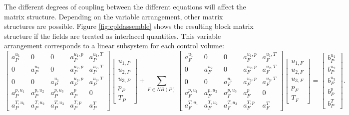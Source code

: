 The different degrees of coupling between the different equations will affect the matrix structure. Depending on the variable arrangement, other matrix structures are possible. Figure \ref{fig:cpldassemble} shows the resulting block matrix structure if the fields are treated as interlaced quantities. This variable arrangement corresponds to a linear subsystem for each control volume:
\begin{displaymath}
\left[
  \begin{array}{ccccc}
    a_P^{u_1}   & 0           & 0           & a_P^{u_1,p} & a_P^{u_1,T} \\[0.5em]
    0           & a_P^{u_2}   & 0           & a_P^{u_2,p} & a_P^{u_2,T} \\[0.5em]
    0           & 0           & a_P^{u_1}   & a_P^{u_3,p} & a_P^{u_3,T} \\[0.5em]
    a_P^{p,u_1} & a_P^{p,u_2} & a_P^{p,u_3} & a_P^{p}     & 0           \\[0.5em]
    a_P^{T,u_1} & a_P^{T,u_2} & a_P^{T,u_3} & a_P^{T,p}   & a_P^{T}
  \end{array}
\right]
\left[
\begin{array}{c}
  u_{1,P} \\[0.5em]
  u_{2,P} \\[0.5em]
  u_{3,P} \\[0.5em]
  p_{P  } \\[0.5em]
  T_{P}
\end{array}
\right]
+
\sum_{F \in NB(P)}
\left[
  \begin{array}{ccccc}
    a_F^{u_1}   & 0           & 0           & a_F^{u_1,p} & a_F^{u_1,T} \\[0.5em]
    0           & a_F^{u_2}   & 0           & a_F^{u_2,p} & a_F^{u_2,T} \\[0.5em]
    0           & 0           & a_F^{u_1}   & a_F^{u_3,p} & a_F^{u_3,T} \\[0.5em]
    a_F^{p,u_1} & a_F^{p,u_2} & a_F^{p,u_3} & a_F^{p}     & 0           \\[0.5em]
    a_F^{T,u_1} & a_F^{T,u_2} & a_F^{T,u_3} & a_F^{T,p}   & a_F^{T}
  \end{array}
\right]
\left[
\begin{array}{c}
  u_{1,F} \\[0.5em]
  u_{2,F} \\[0.5em]
  u_{3,F} \\[0.5em]
  p_{F  } \\[0.5em]
  T_{F}
\end{array}
\right]
=
\left[
\begin{array}{c}
  b_{P}^{u_1} \\[0.5em]
  b_{P}^{u_2} \\[0.5em]
  b_{P}^{u_3} \\[0.5em]
  b_{P}^{p}   \\[0.5em]
  b_{P}^{T}
\end{array}
\right].
\end{displaymath}

